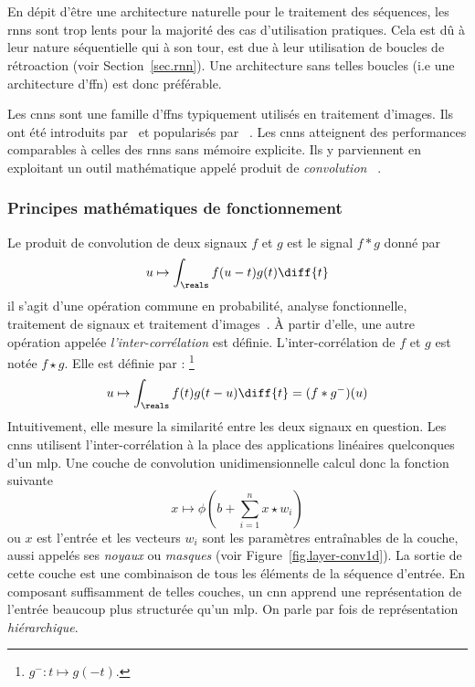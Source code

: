 \section{}
\label{sec.cnn}

En dépit d'être une architecture naturelle pour le traitement des séquences,
les \glspl{rnn} sont trop lents pour la majorité des cas d'utilisation pratiques.
Cela est dû à leur nature séquentielle qui à son tour, 
est due à leur utilisation de boucles de rétroaction (voir Section~\ref{sec.rnn}).
Une architecture sans telles boucles (i.e une architecture d'\gls{ffn}) est donc préférable.

Les \glspl{cnn} sont une famille d'\glspl{ffn} typiquement utilisés en traitement d'images.
Ils ont été introduits par~\cite{Fukushima_1980} et popularisés par%
~\cite{LeCun_Boser_Denker_Henderson_Howard_Hubbard_Jackel_1989,Lecun_Bottou_Bengio_Haffner_1998}.
Les \glspl{cnn} atteignent des performances comparables à celles des \glspl{rnn} sans mémoire explicite.
Ils y parviennent en exploitant un outil mathématique appelé produit de \emph{convolution}%
~\cite{Calin_2020}.

\subsubsection{Principes mathématiques de fonctionnement}

Le produit de convolution de deux signaux \(f\) et \(g\) est le signal \(f \ast g\) donné par
\begin{equation}
    \label{eq.convolution}
    u \mapsto \int_\reals f(u-t)g(t)\diff{t}
\end{equation}
il s'agit d'une opération commune en probabilité, analyse fonctionnelle, 
traitement de signaux et traitement d'images~\cite{Barbe_Ledoux_2012,Oppenheim_Schafer_2013}.
À partir d'elle, une autre opération appelée \emph{l'inter-corrélation} est définie.
L'inter-corrélation de \(f\) et \(g\) est notée \(f\star g\).
Elle est définie par :%
\footnote{\(g^- : t \mapsto g(-t)\).}
\begin{equation}
    \label{eq.cros-corr}
    u \mapsto \int_\reals f(t)g(t-u)\diff{t} = (f \ast g^-)(u)
\end{equation}
Intuitivement, elle mesure la similarité entre les deux signaux en question.
Les \glspl{cnn} utilisent l'inter-corrélation à la place des applications linéaires quelconques d'un \gls{mlp}.
Une couche de convolution unidimensionnelle calcul donc la fonction suivante
\begin{equation}
    \label{eq.layer-conv1d}
    x \mapsto \phi\left(b + \sum_{i=1}^n x\star w_i\right)
\end{equation}
ou \(x\) est l'entrée et les vecteurs \(w_i\) sont les paramètres entraînables de la couche, 
aussi appelés ses \emph{noyaux} ou \emph{masques}
(voir Figure~\ref{fig.layer-conv1d}).
La sortie de cette couche est une combinaison de tous les éléments de la séquence d'entrée.
En composant suffisamment de telles couches,
un \gls{cnn} apprend une représentation de l'entrée beaucoup plus structurée qu'un \gls{mlp}.
On parle par fois de représentation \emph{hiérarchique}.

